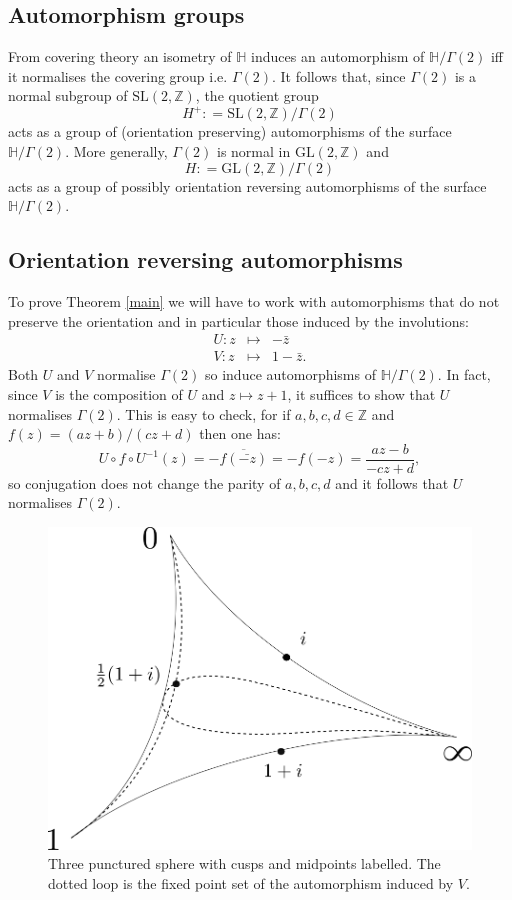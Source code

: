 \documentclass[12pt,a4paper]{amsart}
\def\HH{\mathbb{H}}
\def\xx{\HH/g2}
\def\ZZ{\mathbb{Z}}
\def\gl2{\mathrm{GL}(2, \ZZ)}
\def\sl2{\mathrm{SL}(2, \ZZ)}
\def\g2{\Gamma(2)}
\def\xx{\HH/\g2}
\begin{document}
\subsection{Automorphism groups}
From covering theory an isometry  of $\HH$ 
induces an automorphism of $\xx$ iff it normalises the covering group
i.e. $\g2$.
It follows that,
since $\g2$ is a normal subgroup of $\sl2$,
 the quotient group
$$H^+: = \sl2/\g2$$
acts as a group of (orientation preserving) automorphisms of the surface $\xx$.
More generally, $\g2$ is normal in $\gl2$ and 
$$H: = \gl2/\g2$$
acts as a group of possibly orientation reversing  automorphisms of the surface $\xx$.


\subsection{Orientation reversing automorphisms}
To prove Theorem \ref{main} we will have to work with automorphisms
that do not preserve the orientation and in particular 
those induced by the involutions:
\begin{eqnarray*}
U: z &\mapsto& -\bar{z} \\
V: z &\mapsto& 1 -\bar{z}.
\end{eqnarray*}
Both $U$ and $V$ normalise $\g2$ so induce automorphisms of $\xx$.
In fact, since $V$ is the composition of $U$ and $z \mapsto z + 1$,
it suffices to show that $U$ normalises $\g2$.
This is easy to check, for if  $a,b,c,d \in \ZZ$ 
and  $f(z) = (az + b)/ (cz +d )$  then one has:
$$ U\circ f \circ U^{-1} (z) =  -\overline{f(\bar{-z})} = -f(-z) =   \frac{az - b}{-cz +d }, $$
  so conjugation does not change the parity of $a,b,c,d$ 
  and it follows that  $U$ normalises $\g2$.


 \begin{figure}[hb]
\begin{center}
\includegraphics[scale=.5]{3sphere_again.png} 
\end{center}
\caption{Three punctured sphere with cusps and midpoints labelled.
The dotted loop is the fixed point set of the automorphism induced by $V$.}
 \label{3punctured}
\end{figure}
\end{document}
